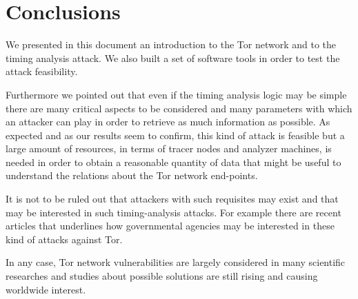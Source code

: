 \section{Conclusions}
We presented in this document an introduction to the Tor network and to
the timing analysis attack. We also built a set of software tools in order
to test the attack feasibility. 

Furthermore we pointed out that even if the timing analysis logic may be simple there are many critical
aspects to be considered and many parameters with which an attacker can
play in order to retrieve as much information as possible. As expected
and as our
results seem to confirm, this kind of attack is feasible but a large
amount of resources, in terms of tracer nodes and analyzer machines, 
is needed in order to obtain a reasonable quantity of data that might be useful to
understand the relations about the Tor network end-points. 

It is not to
be ruled out that attackers with such requisites may exist and that may be
interested in such timing-analysis attacks. For example there are recent
articles\cite{vantor}\cite{schneier2013attacking} that underlines how
governmental agencies may be interested in
these kind of attacks against Tor.  


In any case, Tor network vulnerabilities are largely considered in many
scientific researches and studies about possible solutions are still
rising and causing worldwide interest.

